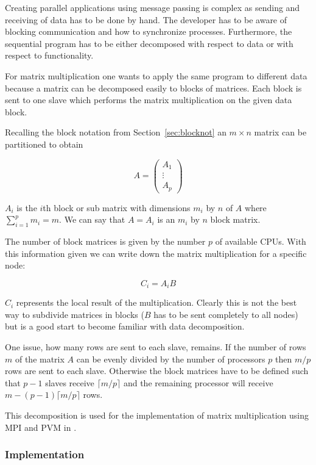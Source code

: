 Creating parallel applications using message passing is
complex as sending and receiving of data has to be done by hand. The
developer has to be aware of blocking communication and how to
synchronize processes. Furthermore, the sequential program has to be
either decomposed with respect to data or with respect to
functionality.

For matrix multiplication one wants to apply the same
program to different data because a matrix can be decomposed
easily to blocks of matrices. Each block is sent to one slave which
performs the matrix multiplication on the given data block.

Recalling the block notation from Section~\ref{sec:blocknot} an $m
\times n$ matrix can be partitioned to obtain

$$ A = \left( \begin{array}{ccc}
A_{1} \\
\vdots\\
A_{p}
\end{array} \right)
$$

$A_{i}$ is the $i$th block or sub matrix with dimensions $m_i$ by
$n$ of $A$ where $\sum_{i=1}^p m_i = m$. 
We can say that $A = A_{i}$ is an $m_i$ by $n$ block
matrix. 

The number of block matrices is given by the number $p$ of available
CPUs. With this information given we can write down the matrix
multiplication for a specific node:

$$ C_{i} = A_{i}B $$

$C_{i}$ represents the local result of the multiplication. Clearly
this is not the best way to subdivide matrices in blocks ($B$ has to
be sent completely to all nodes) but is a good start to become
familiar with data decomposition.

One issue, how many rows are sent to each slave, remains. If the
number of rows $m$ of the matrix $A$ can be evenly divided by the number
of processors $p$ then $m/p$ rows are sent to each slave. Otherwise
the block matrices have to be defined such that 
$p - 1$ slaves receive $\lceil m/p \rceil$ and the remaining processor
will receive $m - (p - 1) \lceil m/p \rceil$ rows.

This decomposition is used for the implementation of matrix
multiplication using MPI and PVM in .

\subsubsection{Implementation}

